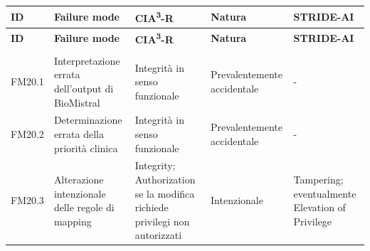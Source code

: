 {
\small
{}
\setlength{\tabcolsep}{4pt}
\renewcommand{\arraystretch}{1.08}

\begin{xltabular}{\textwidth}{
    >{\raggedright\arraybackslash}p{1.35cm}
    X
    >{\raggedright\arraybackslash}p{3.5cm}
    >{\raggedright\arraybackslash}p{2.7cm}
    >{\raggedright\arraybackslash}p{2.4cm}
}

\toprule

\textbf{ID} &
\textbf{Failure mode} &
\textbf{CIA\textsuperscript{3}-R} &
\textbf{Natura} &
\textbf{STRIDE-AI} \\

\midrule

\endfirsthead

\toprule

\textbf{ID} &
\textbf{Failure mode} &
\textbf{CIA\textsuperscript{3}-R} &
\textbf{Natura} &
\textbf{STRIDE-AI} \\

\midrule

\endhead

 \\
\endfoot

\endlastfoot


FM20.1 &

Interpretazione errata dell'output di BioMistral &

Integrità in senso funzionale &

Prevalentemente accidentale &

- \\

\midrule


FM20.2 &

Determinazione errata della priorità clinica &

Integrità in senso funzionale &

Prevalentemente accidentale &

- \\

\midrule


FM20.3 &

Alterazione intenzionale delle regole di mapping &

Integrity; Authorization se la modifica richiede privilegi non autorizzati &

Intenzionale &

Tampering; eventualmente Elevation of Privilege \\


\end{xltabular}}
